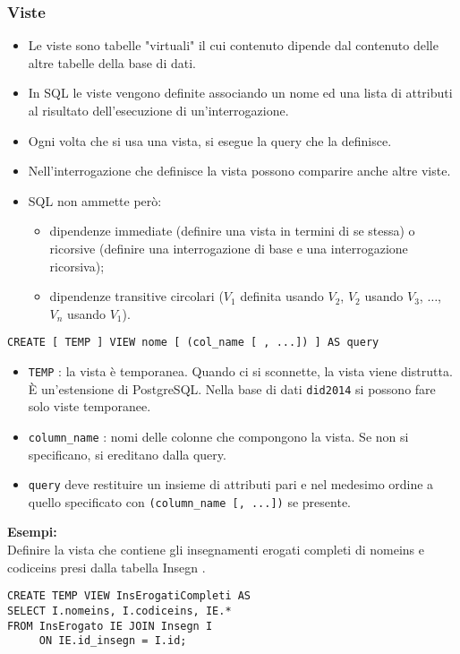 \documentclass[a4paper, 10pt]{article}
\begin{document}
	\subsubsection{Viste}
		\begin{itemize}
				\item Le viste sono tabelle "virtuali" il cui contenuto dipende dal contenuto
				delle altre tabelle della base di dati.
				\item In SQL le viste vengono definite associando un nome ed una lista di
				attributi al risultato dell’esecuzione di un’interrogazione.
				\item Ogni volta che si usa una vista, si esegue la query che la definisce.
				\item Nell’interrogazione che definisce la vista possono comparire anche altre
				viste.
				\item SQL non ammette però:
				\begin{itemize}
						\item dipendenze immediate (definire una vista in termini di se stessa) o
					ricorsive (definire una interrogazione di base e una interrogazione
					ricorsiva);
						\item dipendenze transitive circolari ($ V_1 $ definita usando $ V_2 $, $ V_2 $ usando $ V_3 $, $ \dots $, $ V_n $ usando $ V_1 $).
					\end{itemize}
			\end{itemize}
		\begin{lstlisting}
CREATE [ TEMP ] VIEW nome [ (col_name [ , ...]) ] AS query
		\end{lstlisting}
		\noindent
		\begin{itemize}
				\item \lstinline|TEMP| : la vista è temporanea. Quando ci si sconnette, la vista viene
			distrutta. È un’estensione di PostgreSQL. Nella base di dati \lstinline|did2014| si
			possono fare solo viste temporanee.
			\item \lstinline|column_name| : nomi delle colonne che compongono la vista. Se non si
			specificano, si ereditano dalla query.
			\item \lstinline|query| deve restituire un insieme di attributi pari e nel medesimo ordine
			a quello specificato con \lstinline|(column_name [, ...])| se presente.
			\end{itemize}
		
		
		\bigskip
		
		\textbf{Esempi: }\\
		Definire la vista che contiene gli insegnamenti erogati completi di
		nomeins e codiceins presi dalla tabella Insegn .
		\begin{lstlisting}
CREATE TEMP VIEW InsErogatiCompleti AS
SELECT I.nomeins, I.codiceins, IE.*
FROM InsErogato IE JOIN Insegn I 
     ON IE.id_insegn = I.id;
		\end{lstlisting}
		
\end{document}
